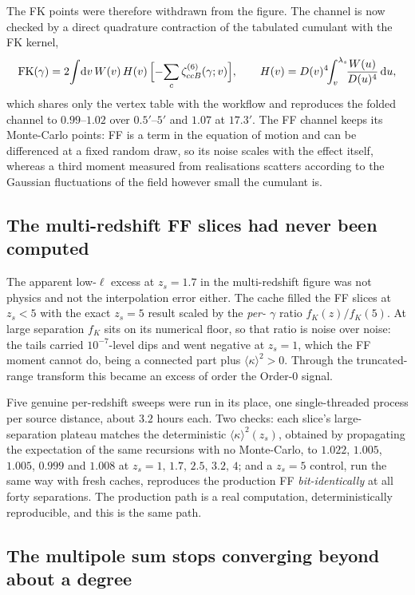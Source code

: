 The FK points were therefore withdrawn from the figure. The channel is now
checked by a direct quadrature contraction of the tabulated cumulant with the
FK kernel,
\[
  \mathrm{FK}(\gamma) = 2\!\int\!\mathrm{d}v\, W(v)\,H(v)\,
     \Bigl[-\!\sum_c \zeta^{(6)}_{cc B}(\gamma; v)\Bigr],
  \qquad
  H(v) = D(v)^4\!\!\int_v^{\lambda_s}\!\!\frac{W(u)}{D(u)^4}\,\mathrm{d}u ,
\]
which shares only the vertex table with the workflow and reproduces the folded
channel to $0.99$--$1.02$ over $0.5'$--$5'$ and $1.07$ at $17.3'$. The FF
channel keeps its Monte-Carlo points: FF is a term in the equation of motion
and can be differenced at a fixed random draw, so its noise scales with the
effect itself, whereas a third moment measured from realisations scatters
according to the Gaussian fluctuations of the field however small the cumulant
is.

\subsection{The multi-redshift FF slices had never been computed}

The apparent low-$\ell$ excess at $z_s=1.7$ in the multi-redshift figure was
not physics and not the interpolation error either. The cache filled the FF
slices at $z_s<5$ with the exact $z_s=5$ result scaled by the \emph{per-%
$\gamma$} ratio $f_K(z)/f_K(5)$. At large separation $f_K$ sits on its
numerical floor, so that ratio is noise over noise: the tails carried
$10^{-7}$-level dips and went negative at $z_s=1$, which the FF moment cannot
do, being a connected part plus $\langle\kappa\rangle^2>0$. Through the
truncated-range transform this became an excess of order the Order-0 signal.

Five genuine per-redshift sweeps were run in its place, one single-threaded
process per source distance, about $3.2$ hours each. Two checks: each slice's
large-separation plateau matches the deterministic $\langle\kappa\rangle^2(z_s)$,
obtained by propagating the expectation of the same recursions with no
Monte-Carlo, to $1.022$, $1.005$, $1.005$, $0.999$ and $1.008$ at
$z_s=1,\,1.7,\,2.5,\,3.2,\,4$; and a $z_s=5$ control, run the same way with
fresh caches, reproduces the production FF \emph{bit-identically} at all forty
separations. The production path is a real computation, deterministically
reproducible, and this is the same path.

\subsection{The multipole sum stops converging beyond about a degree}

